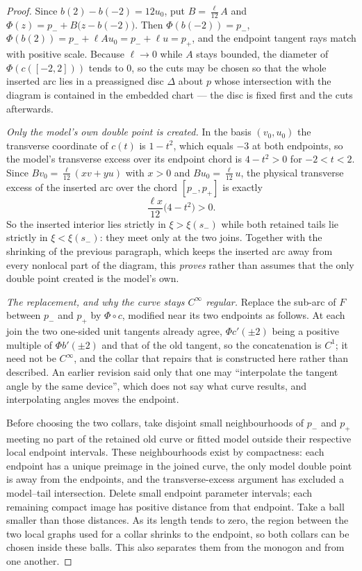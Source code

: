 \begin{proof}
Since $b(2)-b(-2)=12u_0$, put $B=\tfrac{\ell}{12}A$ and
$\Phi(z)=p_-+B\bigl(z-b(-2)\bigr)$. Then $\Phi(b(-2))=p_-$,
$\Phi(b(2))=p_-+\ell A u_0=p_-+\ell u=p_+$, and the endpoint tangent rays match
with positive scale. Because $\ell\to0$ while $A$ stays bounded, the diameter of
$\Phi(c([-2,2]))$ tends to $0$, so the cuts may be chosen so that the whole
inserted arc lies in a preassigned disc $\Delta$ about $p$ whose intersection
with the diagram is contained in the embedded chart --- the disc is fixed first
and the cuts afterwards.

\emph{Only the model's own double point is created.} In the basis $(v_0,u_0)$
the transverse coordinate of $c(t)$ is $1-t^2$, which equals $-3$ at both
endpoints, so the model's transverse excess over its endpoint chord is
$4-t^2>0$ for $-2<t<2$. Since $Bv_0=\tfrac{\ell}{12}(xv+yu)$ with $x>0$ and
$Bu_0=\tfrac{\ell}{12}u$, the physical transverse excess of the inserted arc
over the chord $[p_-,p_+]$ is exactly
\[
   \frac{\ell x}{12}\bigl(4-t^2\bigr)>0 .
\]
So the inserted interior lies strictly in $\xi>\xi(s_-)$ while both retained
tails lie strictly in $\xi<\xi(s_-)$: they meet only at the two joins. Together
with the shrinking of the previous paragraph, which keeps the inserted arc away
from every nonlocal part of the diagram, this \emph{proves} rather than assumes
that the only double point created is the model's own.

\emph{The replacement, and why the curve stays $C^\infty$ regular.} Replace the
sub-arc of $F$ between $p_-$ and $p_+$ by $\Phi\circ c$, modified near its two
endpoints as follows. At each join the two one-sided unit tangents already
agree, $\Phi c'(\pm2)$ being a positive multiple of $\Phi b'(\pm2)$ and that of
the old tangent, so the concatenation is $C^1$; it need not be $C^\infty$, and
the collar that repairs that is constructed here rather than described. An
earlier revision said only that one may ``interpolate the tangent angle by the
same device'', which does not say what curve results, and interpolating angles
moves the endpoint.

Before choosing the two collars, take disjoint small neighbourhoods of
$p_-$ and $p_+$ meeting no part of the retained old curve or fitted model
outside their respective local endpoint intervals. These neighbourhoods
exist by compactness: each endpoint has a unique preimage in the joined
curve, the only model double point is away from the endpoints, and the
transverse-excess argument has excluded a model--tail intersection.
Delete small endpoint parameter intervals; each remaining compact image
has positive distance from that endpoint. Take a ball smaller than those
distances. As its length tends to zero, the region between the two local
graphs used for a collar shrinks to the endpoint, so both collars can be
chosen inside these balls. This also separates them from the monogon and
from one another.


\end{proof}
